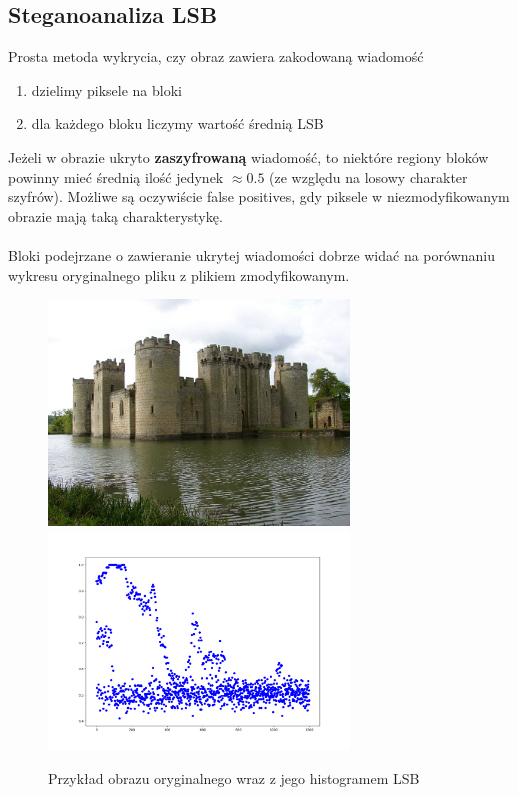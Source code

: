 \documentclass{article}
\begin{document}
\subsection{Steganoanaliza LSB}
Prosta metoda wykrycia, czy obraz zawiera zakodowaną wiadomość
\begin{enumerate}
	\item dzielimy piksele na bloki
	\item dla każdego bloku liczymy wartość średnią LSB
\end{enumerate}
Jeżeli w obrazie ukryto \textbf{zaszyfrowaną} wiadomość, to niektóre regiony bloków
powinny mieć średnią ilość jedynek $\approx 0.5$ (ze względu na losowy charakter szyfrów). Możliwe są
oczywiście false positives, gdy piksele w niezmodyfikowanym obrazie mają taką charakterystykę.
\\\\
Bloki podejrzane o zawieranie ukrytej wiadomości dobrze widać na porównaniu wykresu oryginalnego pliku z plikiem zmodyfikowanym.
\begin{figure}[H]
	\centering
	\includegraphics[width=8cm]{original_castle.jpg}
	\includegraphics[width=8cm]{original_hist.png}
	\caption{Przykład obrazu oryginalnego wraz z jego histogramem LSB}
\end{figure}
\end{document}
